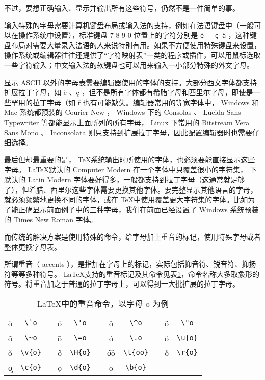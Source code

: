 不过，要想正确输入、显示并输出所有这些符号，仍然不是一件简单的事。

输入特殊的字母需要计算机键盘布局或输入法的支持，例如在法语键盘中（一般可以在操作系统中设置），标准键盘 7 8 9 0 位置上的字符分别是 \verb|è _ ç à| ，这种键盘布局对需要大量录入法语的人来说特别有用。如果不方便使用特殊键盘来设置，操作系统或编辑器往往还提供了“字符映射表”一类的程序或插件，可以用鼠标选取一些字符输入；中文输入法的软键盘也可以用来输入一小部分特殊的外文字母。

显示 ASCII 以外的字母表需要编辑器使用的字体的支持。大部分西文字体都支持扩展拉丁字母，如 è 、ç ，但不是所有字体都有希腊字母和西里尔字母，即使是一些罕用的拉丁字母（如 ř 也有可能缺失。编辑器常用的等宽字体中， Windows 和 Mac 系统都预装的 Courier New ， Windows 下的 Consolas 、 Lucida Sans Typewriter 等都能显示上面所列的所有字母， Linux 下常用的 Bitstream Vera Sans Mono 、 Inconsolata 则只支持到扩展拉丁字母，因此配置编辑器时也需要仔细选择。

最后但却最重要的是， \TeX 系统输出时所使用的字体，也必须要能直接显示这些字母。 \LaTeX 默认的 Computer Modern 在一个字体中只覆盖很小的字符集， \XeLaTeX 下默认的 Latin Modern 字体要好得多，一般都支持到拉丁字母（这通常就足够了），但希腊、西里尔这些字体需要更换其他字体。要完整显示其他语言的字母，就必须频繁地更换不同的字体，或在 \TeX 中使用覆盖更大字符集的字体。比如为了能正确显示前面例子中的三种字母，我们在前面已经设置了 Windows 系统预装的 Times New Roman 字体。

而传统的解决方案是使用特殊的命令，给字母加上重音的标记，使用特殊字母或者整体更换字母表。

所谓重音（ accents ），是指加在字母上的标记，实际包括抑音符、锐音符、抑扬符等等多种符号。 \LaTeX 支持的重音标记及其命令见表\ref{tab:zhongyin}，命令名称大多取象形的符号。将重音加之于普通的拉丁字母上，可以得到一大批扩展的拉丁字母。

\begin{table}[H]
    \centering
    \caption{\LaTeX 中的重音命令，以字母 o 为例}
    \label{tab:zhongyin}
    \begin{tabular}{ccccccccccc}
        \toprule
        \`o & \verb|\`o| 
        & \qquad &
        \'o & \verb|\'o| 
        & \qquad &
        \^o & \verb|\^o| 
        & \qquad &
        \"o & \verb|\"o| \\
        \~o & \verb|\~o| 
        & \qquad &
        \=o & \verb|\=o| 
        & \qquad &
        \.o & \verb|\.o| 
        & \qquad &
        \u{o} & \verb|\u{o}| \\
        \v{o} & \verb|\v{o}| 
        & \qquad &
        \H{o} & \verb|\H{o}| 
        & \qquad &
        \t{oo} & \verb|\t{oo}| 
        & \qquad &
        \r{o} & \verb|\r{o}| \\
        \c{o} & \verb|\c{o}| 
        & \qquad &
        \d{o} & \verb|\d{o}| 
        & \qquad &
        \b{o} & \verb|\b{o}| 
        & \qquad &
         &  \\
    \bottomrule
    \end{tabular}
\end{table}


